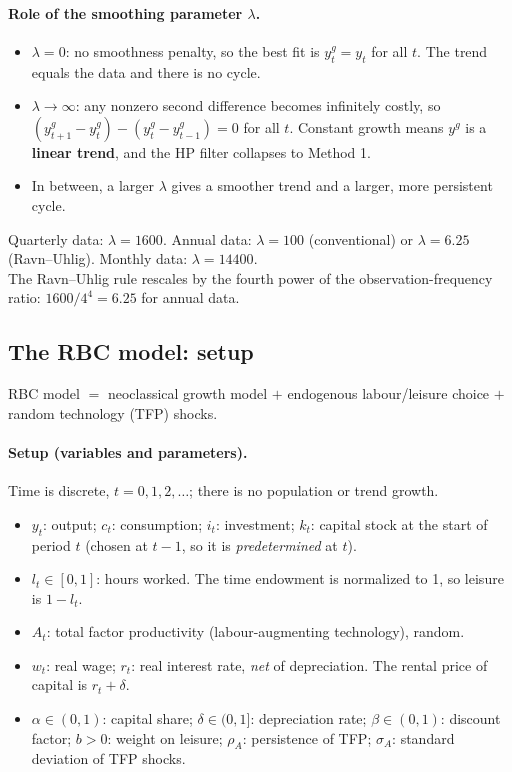 \paragraph{Role of the smoothing parameter $\lambda$.}
\begin{itemize}
  \item $\lambda=0$: no smoothness penalty, so the best fit is $y_t^g=y_t$ for all $t$. The trend equals the data and there is no cycle.
  \item $\lambda\to\infty$: any nonzero second difference becomes infinitely costly, so $(y_{t+1}^g-y_t^g)-(y_t^g-y_{t-1}^g)=0$ for all $t$. Constant growth means $y^g$ is a \textbf{linear trend}, and the HP filter collapses to Method 1.
  \item In between, a larger $\lambda$ gives a smoother trend and a larger, more persistent cycle.
\end{itemize}
\begin{keybox}[title=Standard values of $\lambda$]
Quarterly data: $\lambda=1600$. \quad Annual data: $\lambda=100$ (conventional) or $\lambda=6.25$ (Ravn--Uhlig). \quad Monthly data: $\lambda=14400$.\\[2pt]
The Ravn--Uhlig rule rescales by the fourth power of the observation-frequency ratio: $1600/4^4=6.25$ for annual data.
\end{keybox}

\subsection{The RBC model: setup }

\begin{keybox}[title=RBC model]
RBC model $=$ neoclassical growth model $+$ endogenous labour/leisure choice $+$ random technology (TFP) shocks.
\end{keybox}

\paragraph{Setup (variables and parameters).} Time is discrete, $t=0,1,2,\dots$; there is no population or trend growth.
\begin{itemize}
  \item $y_t$: output; $c_t$: consumption; $i_t$: investment; $k_t$: capital stock at the start of period $t$ (chosen at $t-1$, so it is \emph{predetermined} at $t$).
  \item $l_t\in[0,1]$: hours worked. The time endowment is normalized to 1, so leisure is $1-l_t$.
  \item $A_t$: total factor productivity (labour-augmenting technology), random.
  \item $w_t$: real wage; $r_t$: real interest rate, \emph{net} of depreciation. The rental price of capital is $r_t+\delta$.
  \item $\alpha\in(0,1)$: capital share; $\delta\in(0,1]$: depreciation rate; $\beta\in(0,1)$: discount factor; $b>0$: weight on leisure; $\rho_A$: persistence of TFP; $\sigma_A$: standard deviation of TFP shocks.
\end{itemize}

